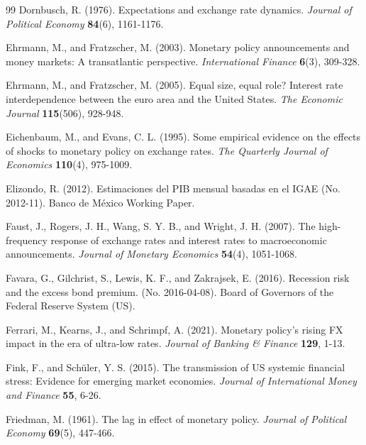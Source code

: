 \documentclass[12pt, reqno]{article}
\begin{document}
\begin{thebibliography}{99}
\bibitem{} \hypertarget{Dornbusch (1976)}{}Dornbusch, R. (1976). Expectations and exchange rate dynamics. \textit{Journal of Political Economy} \textbf{84}(6), 1161-1176.

\bibitem{} \hypertarget{Ehrmann and Fratzscher (2003)}{}Ehrmann, M., and Fratzscher, M. (2003). Monetary policy announcements and money markets: A transatlantic perspective. \textit{International Finance} \textbf{6}(3), 309-328.

\bibitem{} \hypertarget{Ehrmann and Fratzscher (2005)}{}Ehrmann, M., and Fratzscher, M. (2005). Equal size, equal role? Interest rate interdependence between the euro area and the United States. \textit{The Economic Journal} \textbf{115}(506), 928-948.

\bibitem{} \hypertarget{Eichenbaum and Evans (1995)}{}Eichenbaum, M., and Evans, C. L. (1995). Some empirical evidence on the effects of shocks to monetary policy on exchange rates. \textit{The Quarterly Journal of Economics} \textbf{110}(4), 975-1009.

\bibitem{} \hypertarget{Elizondo (2012)}{}Elizondo, R. (2012). Estimaciones del PIB mensual basadas en el IGAE (No. 2012-11). Banco de México Working Paper.

\bibitem{} \hypertarget{Faust et al. (2007)}{}Faust, J., Rogers, J. H., Wang, S. Y. B., and Wright, J. H. (2007). The high-frequency response of exchange rates and interest rates to macroeconomic announcements. \textit{Journal of Monetary Economics} \textbf{54}(4), 1051-1068.

\bibitem{} \hypertarget{Favara (2016)}{} Favara, G., Gilchrist, S., Lewis, K. F., and Zakrajsek, E. (2016). Recession risk and the excess bond premium. (No. 2016-04-08). Board of Governors of the Federal Reserve System (US).

\bibitem{} \hypertarget{Ferrari et al. (2021)}{}Ferrari, M., Kearns, J., and Schrimpf, A. (2021). Monetary policy’s rising FX impact in the era of ultra-low rates. \textit{Journal of Banking \& Finance} \textbf{129}, 1-13.

\bibitem{} \hypertarget{Fink (2015)}{} Fink, F., and Schüler, Y. S. (2015). The transmission of US systemic financial stress: Evidence for emerging market economies. \textit{Journal of International Money and Finance} \textbf{55}, 6-26.

\bibitem{} \hypertarget{Friedman (1961)}{} Friedman, M. (1961). The lag in effect of monetary policy. \textit{Journal of Political Economy} \textbf{69}(5), 447-466.


\end{thebibliography}
\end{document}
